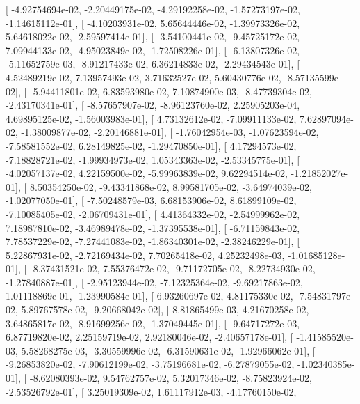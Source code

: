 \documentclass{article}
\begin{document}
       [ -4.92754694e-02,  -2.20449175e-02,  -4.29192258e-02,
         -1.57273197e-02,  -1.14615112e-01],
       [ -4.10203931e-02,   5.65644446e-02,  -1.39973326e-02,
          5.64618022e-02,  -2.59597414e-01],
       [ -3.54100441e-02,  -9.45725172e-02,   7.09944133e-02,
         -4.95023849e-02,  -1.72508226e-01],
       [ -6.13807326e-02,  -5.11652759e-03,  -8.91217433e-02,
          6.36214833e-02,  -2.29434543e-01],
       [  4.52489219e-02,   7.13957493e-02,   3.71632527e-02,
          5.60430776e-02,  -8.57135599e-02],
       [ -5.94411801e-02,   6.83593980e-02,   7.10874900e-03,
         -8.47739304e-02,  -2.43170341e-01],
       [ -8.57657907e-02,  -8.96123760e-02,   2.25905203e-04,
          4.69895125e-02,  -1.56003983e-01],
       [  4.73132612e-02,  -7.09911133e-02,   7.62897094e-02,
         -1.38009877e-02,  -2.20146881e-01],
       [ -1.76042954e-03,  -1.07623594e-02,  -7.58581552e-02,
          6.28149825e-02,  -1.29470850e-01],
       [  4.17294573e-02,  -7.18828721e-02,  -1.99934973e-02,
          1.05343363e-02,  -2.53345775e-01],
       [ -4.02057137e-02,   4.22159500e-02,  -5.99963839e-02,
          9.62294514e-02,  -1.21852027e-01],
       [  8.50354250e-02,  -9.43341868e-02,   8.99581705e-02,
         -3.64974039e-02,  -1.02077050e-01],
       [ -7.50248579e-03,   6.68153906e-02,   8.61899109e-02,
         -7.10085405e-02,  -2.06709431e-01],
       [  4.41364332e-02,  -2.54999962e-02,   7.18987810e-02,
         -3.46989478e-02,  -1.37395538e-01],
       [ -6.71159843e-02,   7.78537229e-02,  -7.27441083e-02,
         -1.86340301e-02,  -2.38246229e-01],
       [  5.22867931e-02,  -2.72169434e-02,   7.70265418e-02,
          4.25232498e-03,  -1.01685128e-01],
       [ -8.37431521e-02,   7.55376472e-02,  -9.71172705e-02,
         -8.22734930e-02,  -1.27840887e-01],
       [ -2.95123944e-02,  -7.12325364e-02,  -9.69217863e-02,
          1.01118869e-01,  -1.23990584e-01],
       [  6.93260697e-02,   4.81175330e-02,  -7.54831797e-02,
          5.89767578e-02,  -9.20668042e-02],
       [  8.81865499e-03,   4.21670258e-02,   3.64865817e-02,
         -8.91699256e-02,  -1.37049445e-01],
       [ -9.64717272e-03,   6.87719820e-02,   2.25159719e-02,
          2.92180046e-02,  -2.40657178e-01],
       [ -1.41585520e-03,   5.58268275e-03,  -3.30559996e-02,
         -6.31590631e-02,  -1.92966062e-01],
       [ -9.26853820e-02,  -7.90612199e-02,  -3.75196681e-02,
         -6.27879055e-02,  -1.02340385e-01],
       [ -8.62080393e-02,   9.54762757e-02,   5.32017346e-02,
         -8.75823924e-02,  -2.53526792e-01],
       [  3.25019309e-02,   1.61117912e-03,  -4.17760150e-02,
\end{document}
